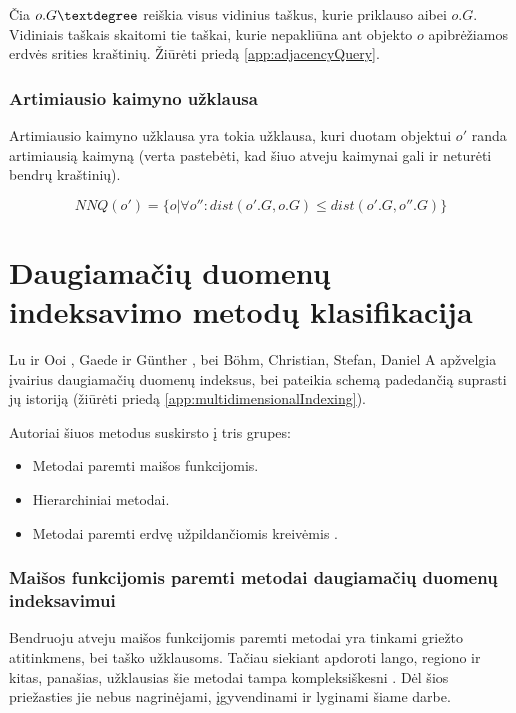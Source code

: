 Čia $o.G\textdegree$ reiškia visus vidinius taškus, kurie priklauso aibei $o.G$.
Vidiniais taškais skaitomi tie taškai, kurie nepakliūna ant objekto $o$ apibrėžiamos erdvės srities kraštinių.
Žiūrėti priedą \ref{app:adjacencyQuery}.


\subsubsection{Artimiausio kaimyno užklausa}
Artimiausio kaimyno užklausa yra tokia užklausa, kuri duotam objektui $o'$ randa artimiausią kaimyną (verta pastebėti, kad šiuo atveju kaimynai gali ir neturėti bendrų kraštinių).

\begin{equation}
	NNQ(o') = \{ o | \forall o'' : dist(o'.G, o.G) \leq dist(o'.G, o''.G) \}
\label{eq:ExactMatchQuery}
\end{equation}




\section{Daugiamačių duomenų indeksavimo metodų klasifikacija}
Lu ir Ooi \cite{lu1993spatial}, Gaede ir Günther \cite{gaede1998multidimensional}, bei B{\"o}hm, Christian, Stefan, Daniel A \cite{bohm2001searching} apžvelgia įvairius daugiamačių duomenų indeksus, bei pateikia schemą padedančią suprasti jų istoriją (žiūrėti priedą \ref{app:multidimensionalIndexing}).

Autoriai šiuos metodus suskirsto į tris grupes:
\begin{itemize}
	\item Metodai paremti maišos funkcijomis.
	\item Hierarchiniai metodai.
	\item Metodai paremti erdvę užpildančiomis kreivėmis \cite{bader2012space}.
\end{itemize}



\subsubsection{Maišos funkcijomis paremti metodai daugiamačių duomenų indeksavimui}

Bendruoju atveju maišos funkcijomis paremti metodai yra tinkami griežto atitinkmens, bei taško užklausoms.
Tačiau siekiant apdoroti lango, regiono ir kitas, panašias, užklausias šie metodai tampa kompleksiškesni \cite{nievergelt1981grid} \cite{tamminen1982excell}.
Dėl šios priežasties jie nebus nagrinėjami, įgyvendinami ir lyginami šiame darbe.


